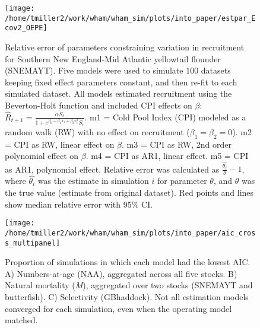 \documentclass[]{article}
\begin{document}
\begin{landscape}
\begin{figure}

{\centering \texttt{[image: /home/tmiller2/work/wham/wham\_sim/plots/into\_paper/estpar\_Ecov2\_OEPE]} 

}

\caption{Relative error of parameters constraining variation in recruitment for Southern New England-Mid Atlantic yellowtail flounder (SNEMAYT). Five models were used to simulate 100 datasets keeping fixed effect parameters constant, and then re-fit to each simulated dataset. All models estimated recruitment using the Beverton-Holt function and included CPI effects on $\beta$: $\hat{R}_{t+1} = \frac{\alpha S_{t}}{1 + e^{\beta_0 + \beta_1 x_{t} + \beta_2 x^2_{t}} S_t}$. m1 = Cold Pool Index (CPI) modeled as a random walk (RW) with no effect on recruitment ($\beta_1 = \beta_2 = 0$). m2 = CPI as RW, linear effect on $\beta$. m3 = CPI as RW, 2nd order polynomial effect on $\beta$. m4 = CPI as AR1, linear effect. m5 = CPI as AR1, polynomial effect. Relative error was calculated as $\frac{\hat{\theta_i}}{\theta} - 1$, where $\hat{\theta_i}$ was the estimate in simulation $i$ for parameter $\theta$, and $\theta$ was the true value (estimate from original dataset). Red points and lines show median relative error with 95\% CI.}\label{fig:estpar-ecov}
\end{figure}
\end{landscape}

\pagebreak

\begin{figure}

{\centering \texttt{[image: /home/tmiller2/work/wham/wham\_sim/plots/into\_paper/aic\_cross\_multipanel]} 

}

\caption{Proportion of simulations in which each model had the lowest AIC. A) Numbers-at-age (NAA), aggregated across all five stocks. B) Natural mortality (\textit{M}), aggregated over two stocks (SNEMAYT and butterfish). C) Selectivity (GBhaddock). Not all estimation models converged for each simulation, even when the operating model matched.}\label{fig:aic-cross}
\end{figure}
\end{document}
